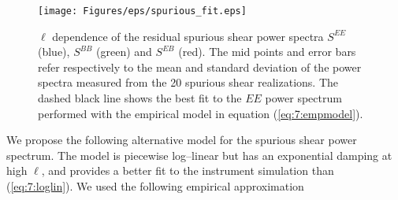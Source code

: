 %
\begin{figure}
\begin{center}
\texttt{[image: Figures/eps/spurious\_fit.eps]}
\end{center}
\caption{$\ell$ dependence of the residual spurious shear power spectra $S^{EE}$ (blue), $S^{BB}$ (green) and $S^{EB}$ (red). The mid points and error bars refer respectively to the mean and standard deviation of the power spectra measured from the 20 spurious shear realizations. The dashed black line shows the best fit to the $EE$ power spectrum performed with the empirical model in equation (\ref{eq:7:empmodel}).}
\label{fig:7:spfit}
\end{figure} 
%
We propose the following alternative model for the spurious shear power spectrum. The model is piecewise log--linear but has an exponential damping at high $\ell$, and provides a better fit to the instrument simulation than (\ref{eq:7:loglin}). We used the following empirical approximation

